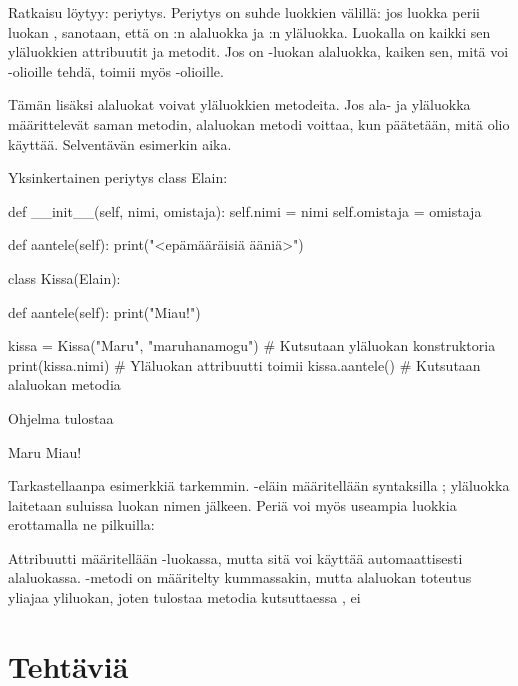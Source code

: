 Ratkaisu löytyy: \gls{periytys}. Periytys on suhde luokkien välillä: jos luokka  perii luokan , sanotaan, että  on :n alaluokka ja  :n yläluokka. Luokalla on kaikki sen yläluokkien attribuutit ja metodit. Jos  on -luokan alaluokka, kaiken sen, mitä voi -olioille tehdä, toimii myös -olioille.

Tämän lisäksi alaluokat voivat  yläluokkien metodeita. Jos ala- ja yläluokka määrittelevät saman metodin, alaluokan metodi voittaa, kun päätetään, mitä olio käyttää. Selventävän esimerkin aika.

\begin{example}{Yksinkertainen periytys}
class Elain:

       def __init__(self, nimi, omistaja):
              self.nimi = nimi
              self.omistaja = omistaja

       def aantele(self):
              print("<epämääräisiä ääniä>")

class Kissa(Elain):

       def aantele(self):
              print("Miau!")

kissa = Kissa("Maru", "maruhanamogu") # Kutsutaan yläluokan konstruktoria
print(kissa.nimi) # Yläluokan attribuutti toimii
kissa.aantele() # Kutsutaan alaluokan metodia
\end{example}

Ohjelma tulostaa

\begin{output}
Maru
Miau!
\end{output}

Tarkastellaanpa esimerkkiä tarkemmin. -eläin määritellään syntaksilla ; yläluokka laitetaan suluissa luokan nimen jälkeen. Periä voi myös useampia luokkia erottamalla ne pilkuilla: 

Attribuutti  määritellään -luokassa, mutta sitä voi käyttää automaattisesti alaluokassa. -metodi on määritelty kummassakin, mutta alaluokan toteutus yliajaa yliluokan, joten  tulostaa metodia kutsuttaessa , ei 

\section{Tehtäviä}

